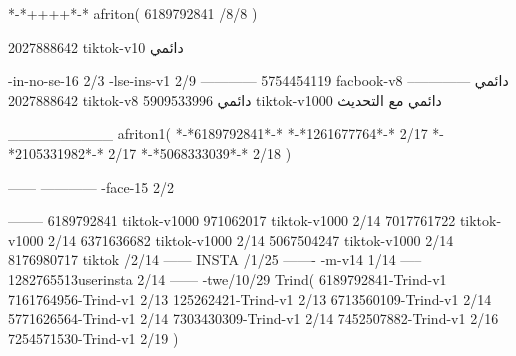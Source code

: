 *-*++++*-*
afriton(
6189792841 /8/8
)

2027888642 tiktok-v10
دائمي

-in-no-se-16 2/3
-lse-ins-v1 2/9
------------
5754454119 facbook-v8
دائمي
--------------
2027888642 tiktok-v8
دائمي
5909533996 tiktok-v1000
دائمي مع التحديث

__________
afriton1(
*-*6189792841*-*
*-*1261677764*-* 2/17
*-*2105331982*-* 2/17
*-*5068333039*-* 2/18
)

------
------------
-face-15 2/2

--------
6189792841 tiktok-v1000
971062017 tiktok-v1000 2/14
7017761722 tiktok-v1000 2/14
6371636682 tiktok-v1000 2/14
5067504247 tiktok-v1000 2/14
8176980717 tiktok /2/14
------
 INSTA /1/25
-------
-m-v14 1/14
-----
1282765513userinsta 2/14
------
-twe/10/29
Trind(
6189792841-Trind-v1 
7161764956-Trind-v1 2/13
125262421-Trind-v1 2/13
6713560109-Trind-v1 2/14
5771626564-Trind-v1 2/14
7303430309-Trind-v1 2/14
7452507882-Trind-v1 2/16
7254571530-Trind-v1 2/19
)
